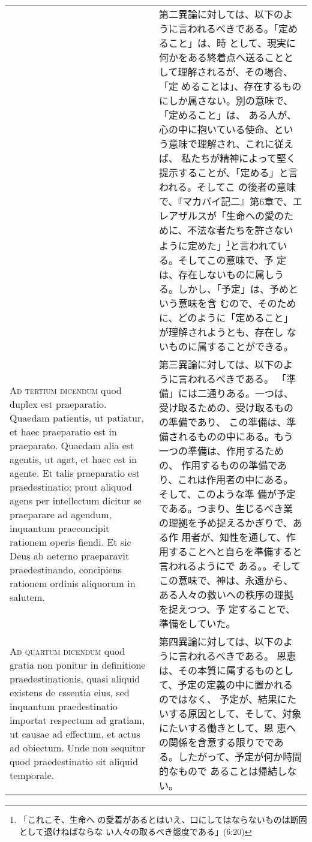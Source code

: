 \documentclass[10pt]{jsarticle} %
\begin{document}
\begin{longtable}{p{21em}p{21em}}
&

第二異論に対しては、以下のように言われるべきである。「定めること」は、時
 として、現実に何かをある終着点へ送ることとして理解されるが、その場合、「定
 めることは」、存在するものにしか属さない。別の意味で、「定めること」は、
 ある人が、心の中に抱いている使命、という意味で理解され、これに従えば、
 私たちが精神によって堅く提示することが、「定める」と言われる。そしてこ
 の後者の意味で、『マカバイ記二』第6章で、エレアザルスが「生命への愛のた
 めに、不法な者たちを許さないように定めた」\footnote{「これこそ、生命へ
 の愛着があるとはいえ、口にしてはならないものは断固として退けねばならな
 い人々の取るべき態度である」(6:20)}と言われている。そしてこの意味で、予
 定は、存在しないものに属しうる。しかし、「予定」は、予めという意味を含
 むので、そのために、どのように「定めること」が理解されようとも、存在し
 ないものに属することができる。
 

\\


{\scshape Ad tertium dicendum} quod duplex est
praeparatio. Quaedam patientis, ut patiatur, et haec praeparatio est in
praeparato. Quaedam alia est agentis, ut agat, et haec est in agente. Et
talis praeparatio est praedestinatio; prout aliquod agens per
intellectum dicitur se praeparare ad agendum, inquantum praeconcipit
rationem operis fiendi. Et sic Deus ab aeterno praeparavit
praedestinando, concipiens rationem ordinis aliquorum in salutem.


&

 第三異論に対しては、以下のように言われるべきである。
「準備」には二通りある。一つは、受け取るための、受け取るものの準備であり、
 この準備は、準備されるものの中にある。もう一つの準備は、作用するための、
 作用するものの準備であり、これは作用者の中にある。そして、このような準
 備が予定である。つまり、生じるべき業の理拠を予め捉えるかぎりで、ある作
 用者が、知性を通して、作用することへと自らを準備すると言われるようにで
 ある。。そして
 この意味で、神は、永遠から、ある人々の救いへの秩序の理拠を捉えつつ、予
 定することで、準備をしていた。
 

\\


{\scshape Ad quartum dicendum} quod gratia non ponitur
in definitione praedestinationis, quasi aliquid existens de essentia
eius, sed inquantum praedestinatio importat respectum ad gratiam, ut
causae ad effectum, et actus ad obiectum. Unde non sequitur quod
praedestinatio sit aliquid temporale.


&

 第四異論に対しては、以下のように言われるべきである。
 恩恵は、その本質に属するものとして、予定の定義の中に置かれるのではなく、
 予定が、結果にたいする原因として、そして、対象にたいする働きとして、恩
 恵への関係を含意する限りでである。したがって、予定が何か時間的なもので
 あることは帰結しない。


\end{longtable}
\newpage
\end{document}
